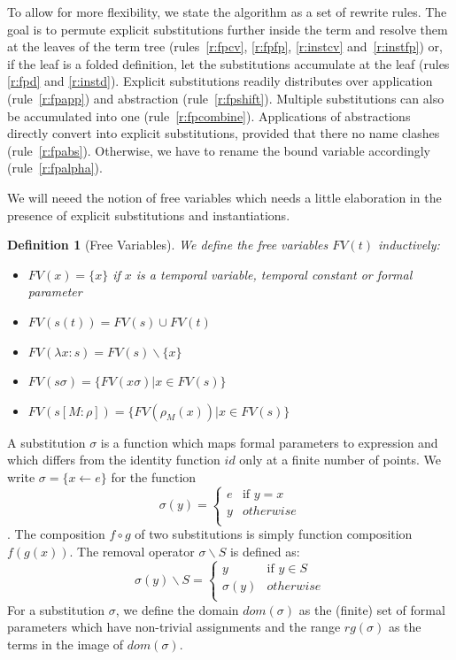 \documentclass[a4paper]{article}
\newcommand{\set}[1]{\{#1\}}
\newcommand{\fpsubstin}[1]{\{#1\}}
\newcommand{\fpscat}[0]{\circ}
\newcommand{\substin}[2]{[#1:#2]}
\newcommand{\fpwith}{\leftarrow}
\newcommand{\fpwithout}[0]{\backslash}
\newcommand{\fpwithoutset}[1]{\backslash\{#1\}}
\newtheorem{definition}{Definition}
\begin{document}
To allow for more flexibility, we state the algorithm as a set of rewrite
rules. The goal is to permute explicit substitutions further inside the
term and resolve them at the leaves of the term tree (rules~\ref{r:fpcv},
\ref{r:fpfp}, \ref{r:instcv} and~\ref{r:instfp}) or,
if the leaf is a folded definition, let the substitutions accumulate at the
leaf (rules \ref{r:fpd} and \ref{r:instd}). Explicit substitutions readily
distributes over application (rule~\ref{r:fpapp}) and abstraction
(rule~\ref{r:fpshift}). Multiple substitutions can also be accumulated
into one (rule~\ref{r:fpcombine}).
Applications of abstractions directly convert into explicit
substitutions, provided that there no name clashes (rule~\ref{r:fpabs}).
Otherwise, we have to rename the bound variable accordingly
(rule~\ref{r:fpalpha}).


We will neeed the notion of free variables which needs a little elaboration
 in the presence of explicit substitutions and instantiations.

 \begin{definition}[Free Variables]
   We define the free variables $FV(t)$ inductively:
   \begin{itemize}
   \item $FV(x) = \set{x}$ if $x$ is a temporal variable, temporal constant or
     formal parameter
   \item $FV(s(t)) = FV(s) \cup FV(t)$
   \item $FV(\lambda x : s) = FV(s) \fpwithoutset{x}$
   \item $FV(s\sigma) = \set{FV(x\sigma) | x \in FV(s) }$
   \item $FV(s\substin{M}{\rho}) = \set{FV(\rho_M(x) ) | x \in FV(s)} $
   \end{itemize}
 \end{definition}

A substitution $\sigma$ is a function which maps formal parameters
to expression and which differs from the identity function $id$ only at a
finite number of points. We write $\sigma=\fpsubstin{x \fpwith e}$ for the
function
\[\sigma(y)=\left\{
    \begin{array}{ll}
      e& \mbox{if }y = x\\
      y & otherwise\\
    \end{array}\right.
\]. The composition $f \fpscat g$ of two substitutions is simply function
composition $f(g(x))$. The removal operator $\sigma\fpwithout S$ is defined
as:
\[\sigma(y)\fpwithout S = \left\{
    \begin{array}{ll}
      y &\mbox{if }y \in S\\
      \sigma(y) & otherwise\\
    \end{array}\right.
\]
For a substitution $\sigma$, we define the domain $dom(\sigma)$ as the (finite)
set of formal parameters which have non-trivial assignments and the range
$rg(\sigma)$ as the terms in the image of $dom(\sigma)$.
\end{document}
